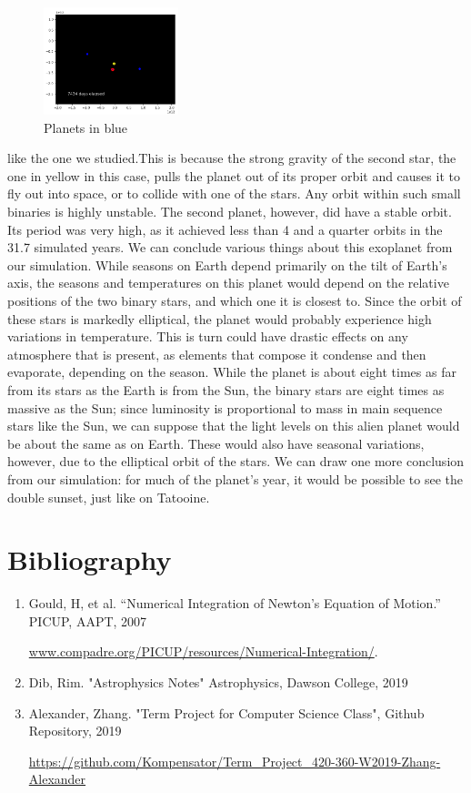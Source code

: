 \documentclass[12pt]{article}
\begin{document}
\begin{figure} 
    \centering
    \includegraphics[width=0.35\textwidth]{report/images/binaryejected}
    \caption{Planets in blue}
\end{figure}
like the one we studied.This is because the strong gravity of the second star, the one in yellow in this case, pulls the planet out of its proper orbit and causes it to fly out into space, or to collide with one of the stars. Any orbit within such small binaries is highly unstable. The second planet, however, did have a stable orbit. Its period was very high, as it achieved less than 4 and a quarter orbits in the 31.7 simulated years. We can conclude various things about this exoplanet from our simulation. While seasons on Earth depend primarily on the tilt of Earth's axis, the seasons and temperatures on this planet would depend on the relative positions of the two binary stars, and which one it is closest to. Since the orbit of these stars is markedly elliptical, the planet would probably experience high variations in temperature. This is turn could have drastic effects on any atmosphere that is present, as elements that compose it condense and then evaporate, depending on the season. While the planet is about eight times as far from its stars as the Earth is from the Sun, the binary stars are eight times as massive as the Sun; since luminosity is proportional to mass in main sequence stars like the Sun, we can suppose that the light levels on this alien planet would be about the same as on Earth. These would also have seasonal variations, however, due to the elliptical orbit of the stars. We can draw one more conclusion from our simulation: for much of the planet's year, it would be possible to see the double sunset, just like on Tatooine.
\section{Bibliography}
\begin{enumerate}
    \item Gould, H, et al. “Numerical Integration of Newton's Equation of Motion.” PICUP, AAPT, 2007 
    
    \url{www.compadre.org/PICUP/resources/Numerical-Integration/}.

    \item Dib, Rim. "Astrophysics Notes" Astrophysics, Dawson College, 2019
    
    \item Alexander, Zhang. "Term Project for Computer Science Class", Github Repository, 2019
    
    \url{https://github.com/Kompensator/Term_Project_420-360-W2019-Zhang-Alexander}
    
\end{enumerate}
\end{document}
